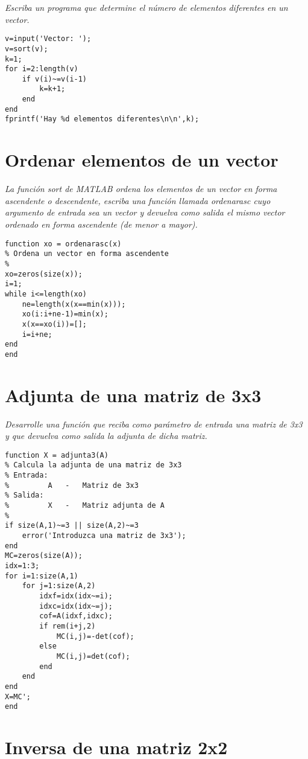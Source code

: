 \textit{Escriba un programa que determine el número de elementos diferentes en un vector.}

\sol

\begin{verbatim}
v=input('Vector: ');
v=sort(v);
k=1;
for i=2:length(v)
    if v(i)~=v(i-1)
        k=k+1;
    end
end
fprintf('Hay %d elementos diferentes\n\n',k);
\end{verbatim}

\section{Ordenar elementos de un vector}

\textit{La función sort de MATLAB ordena los elementos de un vector en forma ascendente o descendente, escriba una función llamada ordenarasc cuyo argumento de entrada sea un vector y devuelva como salida el mismo vector ordenado en forma ascendente (de menor a mayor).}

\sol

\begin{verbatim}
function xo = ordenarasc(x)
% Ordena un vector en forma ascendente
%
xo=zeros(size(x));
i=1;
while i<=length(xo)
    ne=length(x(x==min(x)));
    xo(i:i+ne-1)=min(x);
    x(x==xo(i))=[];
    i=i+ne;
end
end
\end{verbatim}

\section{Adjunta de una matriz de 3x3}

\textit{Desarrolle una función que reciba como parámetro de entrada una matriz de 3x3 y que devuelva como salida la adjunta de dicha matriz.}

\sol

\begin{verbatim}
function X = adjunta3(A)
% Calcula la adjunta de una matriz de 3x3
% Entrada:
%         A   -   Matriz de 3x3
% Salida:
%         X   -   Matriz adjunta de A
%
if size(A,1)~=3 || size(A,2)~=3
    error('Introduzca una matriz de 3x3');
end
MC=zeros(size(A));
idx=1:3;
for i=1:size(A,1)
    for j=1:size(A,2)
        idxf=idx(idx~=i);
        idxc=idx(idx~=j);
        cof=A(idxf,idxc);
        if rem(i+j,2)
            MC(i,j)=-det(cof);
        else
            MC(i,j)=det(cof);
        end
    end
end
X=MC';
end
\end{verbatim}


\section{Inversa de una matriz 2x2}

